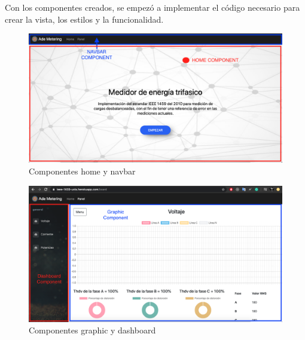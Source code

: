        Con los componentes creados, se empezó a implementar el código necesario para crear la vista, los estilos y la funcionalidad.
        \begin{figure}[H]
            \begin{center}
                \includegraphics[width = 15cm]{3Proyecto/components1}
                \caption{ Componentes home y navbar} 
                \label{fig:components1}
            \end{center}
        \end{figure}
        \begin{figure}[H]
            \begin{center}
                \includegraphics[width = 15cm]{3Proyecto/components2}
                \caption{ Componentes graphic y dashboard} 
                \label{fig:components2}
            \end{center}
        \end{figure}


        \begin{lstlisting}
            
        \end{lstlisting}